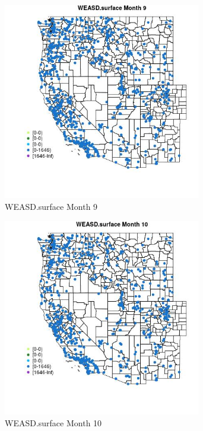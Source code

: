 \begin{figure} 
\centering  
\includegraphics[width=0.77\textwidth]{Code_Outputs/Report_ML_input_PM25_Step4_part_e_de_duplicated_aves_compiled_2019-05-21wNAs_MapObsMo9WEASDsurface.jpg} 
\caption{\label{fig:Report_ML_input_PM25_Step4_part_e_de_duplicated_aves_compiled_2019-05-21wNAsMapObsMo9WEASDsurface}WEASD.surface Month 9} 
\end{figure} 
 

\begin{figure} 
\centering  
\includegraphics[width=0.77\textwidth]{Code_Outputs/Report_ML_input_PM25_Step4_part_e_de_duplicated_aves_compiled_2019-05-21wNAs_MapObsMo10WEASDsurface.jpg} 
\caption{\label{fig:Report_ML_input_PM25_Step4_part_e_de_duplicated_aves_compiled_2019-05-21wNAsMapObsMo10WEASDsurface}WEASD.surface Month 10} 
\end{figure} 
 

